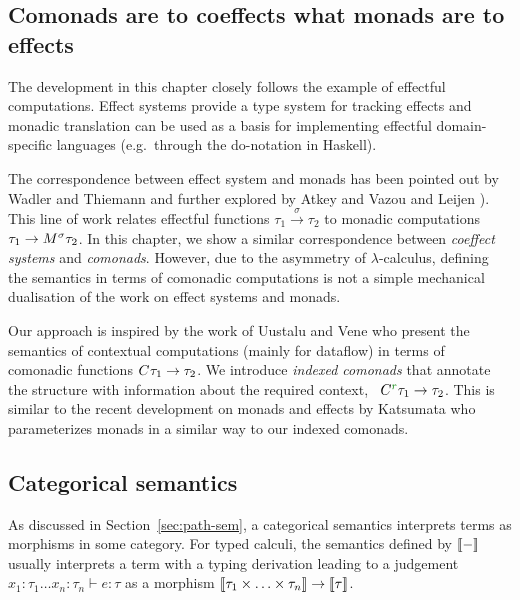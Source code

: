 
\subsection{Comonads are to coeffects what monads are to effects}

The development in this chapter closely follows the example of effectful computations.
Effect systems provide a type system for tracking effects and monadic translation can be used as
a basis for implementing effectful domain-specific languages (e.g.~through the do-notation in
Haskell).

The correspondence between effect system and monads has been pointed out by Wadler and Thiemann
\cite{monads-effects-marriage} and further explored by Atkey \cite{monads-parameterised-notions}
and Vazou and Leijen \cite{monads-effects-remarriage}). This line of work relates effectful
functions $\tau_1 \xrightarrow{\sigma} \tau_2$ to monadic computations
$\tau_1 \rightarrow M^{\sigma}\tau_2$. In this chapter, we show a similar correspondence between
\emph{coeffect systems} and \emph{comonads}. However, due to the asymmetry of $\lambda$-calculus,
defining the semantics in terms of comonadic computations is not a simple mechanical dualisation
of the work on effect systems and monads.

Our approach is inspired by the work of Uustalu and Vene \cite{comonads-notions} who present the
semantics of contextual computations (mainly for dataflow) in terms of comonadic functions
$C^{}\tau_1 \rightarrow \tau_2$. We introduce \emph{indexed comonads} that annotate the structure
with information about the required context, \ie~$\ctyp{\cclrd{r}} \tau_1 \rightarrow \tau_2$.
This is similar to the recent development on monads and effects by Katsumata \cite{monads-parametric}
who parameterizes monads in a similar way to our indexed comonads.


\subsection{Categorical semantics}

As discussed in Section~\ref{sec:path-sem}, a categorical semantics interprets terms as morphisms
in some category. For typed calculi, the semantics defined by $\llbracket - \rrbracket$ usually interprets a term
with a typing derivation leading to a judgement $x_1 \!:\! \tau_1 \ldots x_n \!:\! \tau_n \vdash e: \tau$
as a morphism $\llbracket \tau_1 \times \ldots \times \tau_n \rrbracket \rightarrow \llbracket \tau \rrbracket$.

